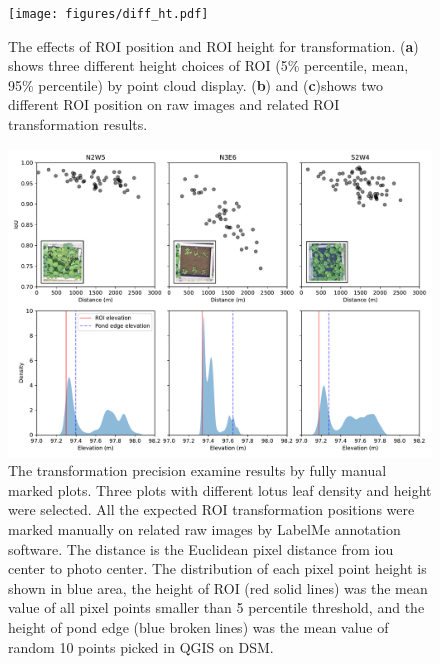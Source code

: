 \documentclass{configs/bmcart}
\begin{document}
\begin{backmatter}
\begin{figure}[!htb]
  \texttt{[image: figures/diff\_ht.pdf]}
  \caption{The effects of ROI position and ROI height for transformation. (\textbf{a}) shows three different height choices of ROI (5\% percentile, mean, 95\% percentile) by point cloud display. (\textbf{b}) and (\textbf{c})shows two different ROI position on raw images and related ROI transformation results.}
  \label{fig:ht_diff}
\end{figure}

\begin{figure}[!htb]
  \includegraphics[width=0.95\linewidth]{figures/dist.pdf}
  \caption{The transformation precision examine results by fully manual marked plots. Three plots with different lotus leaf density and height were selected. All the expected ROI transformation positions were marked manually on related raw images by LabelMe annotation software. The distance is the Euclidean pixel distance from \acrfull*{iou} center to photo center. The distribution of each pixel point height is shown in blue area, the height of ROI (red solid lines) was the mean value of all pixel points smaller than 5 percentile threshold, and the height of pond edge (blue broken lines) was the mean value of random 10 points picked in QGIS on DSM.}
  \label{fig:dist}
\end{figure}


\end{backmatter}
\end{document}

